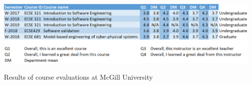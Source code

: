 \documentclass{xetexCV}
\begin{document}
\begin{table}[htb]
\centering
\includegraphics[width=\textwidth]{figures/TeachingEval}
\caption{Results of course evaluations at McGill University}
\label{fig:course-eval}
\end{table}






%
%
%
%
%
%
%
%
%
%
%
%
%
%
% 
%


\end{document}
